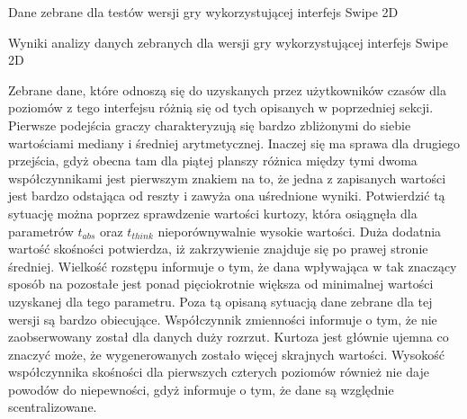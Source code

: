 \documentclass[a4paper,12pt,numbers=noenddot]{report}
\begin{document}
\begin{table}
  \caption{Dane zebrane dla testów wersji gry wykorzystującej interfejs Swipe 2D}
  \resizebox{0.9\textwidth}{!}{%
	
  }
  \label{tab:results_Swipe2d}%
  
  
  \caption{Wyniki analizy danych zebranych dla wersji gry wykorzystującej interfejs Swipe 2D}
  \resizebox{0.9\textwidth}{!}{%
	
  }
  \label{tab:analysis_Swipe2d}%
\end{table}%

Zebrane dane, które odnoszą się do uzyskanych przez użytkowników czasów dla poziomów z tego interfejsu różnią się od tych opisanych w poprzedniej sekcji. Pierwsze podejścia graczy charakteryzują się bardzo zbliżonymi do siebie wartościami mediany i średniej arytmetycznej. Inaczej się ma sprawa dla drugiego przejścia, gdyż obecna tam dla piątej planszy różnica między tymi dwoma współczynnikami jest pierwszym znakiem na to, że jedna z zapisanych wartości jest bardzo odstająca od reszty i zawyża ona uśrednione wyniki. Potwierdzić tą sytuację można poprzez sprawdzenie wartości kurtozy, która osiągnęła dla parametrów $t_{abs}$ oraz $t_{think}$ nieporównywalnie wysokie wartości. Duża dodatnia wartość skośności potwierdza, iż zakrzywienie znajduje się po prawej stronie średniej. Wielkość rozstępu informuje o tym, że dana wpływająca w tak znaczący sposób na pozostałe jest ponad pięciokrotnie większa od minimalnej wartości uzyskanej dla tego parametru. Poza tą opisaną sytuacją dane zebrane dla tej wersji są bardzo obiecujące. 
Współczynnik zmienności informuje o tym, że nie zaobserwowany został dla danych duży rozrzut. Kurtoza jest głównie ujemna co znaczyć może, że wygenerowanych zostało więcej skrajnych wartości. Wysokość współczynnika skośności dla pierwszych czterych poziomów również nie daje powodów do niepewności, gdyż informuje o tym, że dane są względnie scentralizowane.
\end{document}
